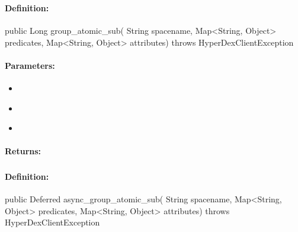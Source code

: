 \subsubsection{}
\label{api:java:group_atomic_sub}


\paragraph{Definition:}
\begin{javacode}
public Long group_atomic_sub(
        String spacename,
        Map<String, Object> predicates,
        Map<String, Object> attributes) throws HyperDexClientException
\end{javacode}

\paragraph{Parameters:}
\begin{itemize}[noitemsep]
\item {}\\

\item {}\\

\item {}\\

\end{itemize}

\paragraph{Returns:}


\pagebreak
\subsubsection{}
\label{api:java:async_group_atomic_sub}


\paragraph{Definition:}
\begin{javacode}
public Deferred async_group_atomic_sub(
        String spacename,
        Map<String, Object> predicates,
        Map<String, Object> attributes) throws HyperDexClientException
\end{javacode}

